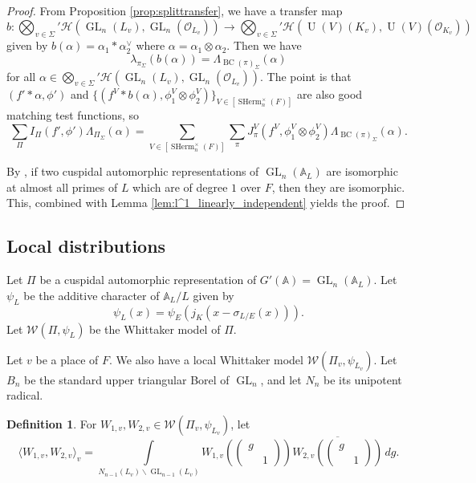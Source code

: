 \documentclass[11pt, reqno]{amsart}
\numberwithin{equation}{subsection}
\theoremstyle{plain}
\theoremstyle{definition}
\newtheorem{definition}[proposition]{Definition}
\newcommand{\bs}{\backslash}
\renewcommand{\AA}{\mathbb A}
\newcommand{\cH}{\mathcal H}
\renewcommand{\O}{\mathcal O}
\newcommand{\ol}{\overline}
\newcommand{\W}{\mathcal W}
\DeclareMathOperator{\GL}{GL}
\DeclareMathOperator{\SHerm}{SHerm}
\DeclareMathOperator{\U}{U}
\begin{document}
\begin{proof}
From Proposition \ref{prop:splittransfer}, we have a
transfer map
\[
    b\colon \bigotimes_{v \in \Sigma}'
    \cH(\GL_n(L_v), \GL_n(\O_{L_v})) \to
    \bigotimes_{v \in \Sigma}'
    \cH(\U(V)(K_v), \U(V)(\O_{K_v}))
\]
given by $b(\alpha) = \alpha_1 \ast \alpha_2^\vee$
where $\alpha = \alpha_1 \otimes \alpha_2$.
Then we have
\[
   \lambda_{\pi_\Sigma}(b(\alpha))
   = \Lambda_{\operatorname{BC}(\pi)_\Sigma}(\alpha) 
\]
for all $\alpha \in \bigotimes_{v \in \Sigma}'
\cH(\GL_n(L_v), \GL_n(\O_{L_v}))$.
The point is that $(f' \ast \alpha, \phi')$ and
$\{(f^V \ast b(\alpha), \phi_1^V
\otimes \phi_2^V)\}_{V \in [\SHerm_n^\times(F)]}$
are also good matching test functions, so
\[
    \sum_\Pi I_\Pi(f', \phi') \Lambda_{\Pi_\Sigma}(\alpha)
    = \sum_{V \in [\SHerm_n^\times(F)]} \sum_\pi
    J^V_\pi(f^V, \phi_1^V \otimes \phi_2^V)
    \Lambda_{\operatorname{BC}(\pi)_\Sigma}(\alpha).
\]

By \cite[Theorem~A]{ramakrishnan2018theorem},
if two cuspidal automorphic representations of
$\GL_n(\AA_L)$ are isomorphic at almost all primes of
$L$ which are of degree $1$ over $F$, then they are
isomorphic.
This, combined with Lemma \ref{lem:l^1_linearly_independent} yields the proof.
\end{proof}

\subsection{Local distributions}
Let $\Pi$ be a cuspidal automorphic representation
of $G'(\AA)=\GL_n(\mathbb A_L)$.
Let $\psi_L$ be the additive character of $\AA_L/L$ 
given by
\[
    \psi_L(x) = \psi_E(j_K(x - \sigma_{L/E}(x))).
\]
Let $\W(\Pi,\psi_L)$ be the Whittaker model of $\Pi$.

Let $v$ be a place of $F$. We also have a local
Whittaker model $\W(\Pi_v, \psi_{L_v})$.
Let $B_n$ be the standard upper triangular Borel of
$\GL_n$, and let $N_n$ be its unipotent radical.

\begin{definition}
For $W_{1,v}, W_{2,v} \in \W(\Pi_v, \psi_{L_v})$, let
\[
    \langle W_{1,v}, W_{2,v} \rangle_v
    =
    \int\limits_{N_{n-1}(L_v) \bs \GL_{n-1}(L_v)}
    W_{1,v}\left(\begin{pmatrix}
        g & \\ & 1
    \end{pmatrix}\right)
    \ol{W_{2,v}\left(\begin{pmatrix}
        g & \\ & 1
    \end{pmatrix}\right)}\,dg.
\]
\end{definition}
\end{document}

